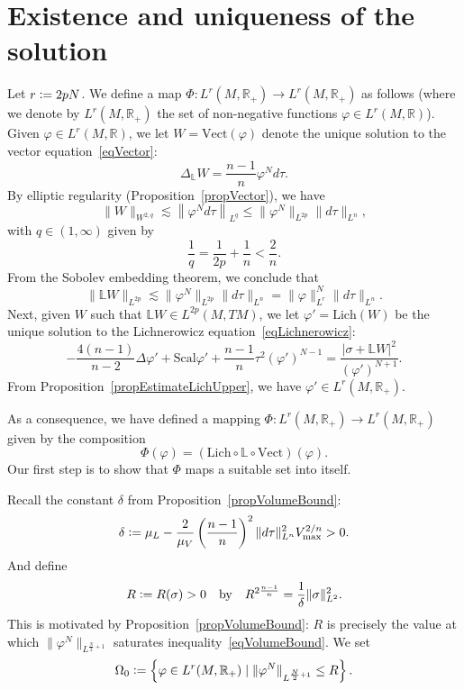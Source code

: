 \documentclass[a4paper, 10pt, reqno]{amsart}
\theoremstyle{plain}
\theoremstyle{remark}
\theoremstyle{definition}
\renewcommand{\phi}{\varphi}
\newcommand{\bR}{\mathbb{R}}
\newcommand{\bL}{\mathbb{L}}
\newcommand{\definedas}{\mathrel{\raise.095ex\hbox{\rm :}\mkern-5.2mu=}}
\newcommand{\scal}{\mathrm{Scal}}
\begin{document}
\section{Existence and uniqueness of the solution}\label{secUniqueness}
Let $r \definedas 2p N$. We define a map $\Phi: L^r(M, \bR_+) \to L^r(M,
	\bR_+)$ as follows (where we denote by $L^r(M, \bR_+)$ the set of non-negative
functions $\phi \in L^r(M, \bR)$). Given $\phi \in L^r(M, \bR)$, we let $W =
	\mathrm{Vect}(\phi)$ denote the unique solution to the vector
equation~\eqref{eqVector}:
\[
	\Delta_{\bL} W = \frac{n-1}{n} \phi^N d\tau.
\]
By elliptic regularity (Proposition~\ref{propVector}), we have
\[
	\|W\|_{W^{2, q}} \lesssim \left\|\phi^N d\tau\right\|_{L^q} \leq \|\phi^N\|_{L^{2p}} \|d\tau\|_{L^n},
\]
with $q \in (1, \infty)$ given by
\[
	\frac{1}{q} = \frac{1}{2p} + \frac{1}{n} < \frac{2}{n}.
\]
From the Sobolev embedding theorem, we conclude that
\[
	\|\bL W\|_{L^{2p}} \lesssim \|\phi^N\|_{L^{2p}} \|d\tau\|_{L^n} = \|\phi\|_{L^r}^N \|d\tau\|_{L^n}.
\]
Next, given $W$ such that $\bL W \in L^{2p}(M, TM)$, we let $\phi' =
	\mathrm{Lich}(W)$ be the unique solution to the Lichnerowicz
equation~\eqref{eqLichnerowicz}:
\[
	-\frac{4(n-1)}{n-2} \Delta \phi' + \scal \phi' + \frac{n-1}{n} \tau^2 (\phi')^{N-1} = \frac{|\sigma + \bL W|^2}{(\phi')^{N+1}}.
\]
From Proposition~\ref{propEstimateLichUpper}, we have $\phi' \in L^r(M,
	\bR_+)$.

As a consequence, we have defined a mapping $\Phi: L^r(M, \bR_+) \to L^r(M,
	\bR_+)$ given by the composition
\[
	\Phi(\phi) = (\mathrm{Lich} \circ \bL \circ \mathrm{Vect})(\phi).
\]
Our first step is to show that $\Phi$ maps a suitable set into itself.

Recall the constant $\delta$ from Proposition~\ref{propVolumeBound}:
\[
	\delta \definedas \mu_L - \frac{2}{\mu_V}\left(\frac{n-1}{n}\right)^2 \|d\tau\|_{L^n}^2 V_{\max}^{2/n} > 0.
\]
And define
\begin{equation}\label{eqDefR}
	R \definedas R(\sigma) > 0 \quad\text{by}\quad
	R^{2\frac{n-1}{n}} = \frac{1}{\delta} \|\sigma\|_{L^2}^2.
\end{equation}
This is motivated by Proposition~\ref{propVolumeBound}: $R$ is precisely the
value at which $\|\phi^N\|_{L^{\frac{N}{2}+1}}$ saturates
inequality~\eqref{eqVolumeBound}. We set
\[
	\Omega_0 \definedas \left\{\phi \in L^r(M, \bR_+) \mid
	\|\phi^N\|_{L^{\frac{N}{2}+1}} \leq R\right\}.
\]
\end{document}

